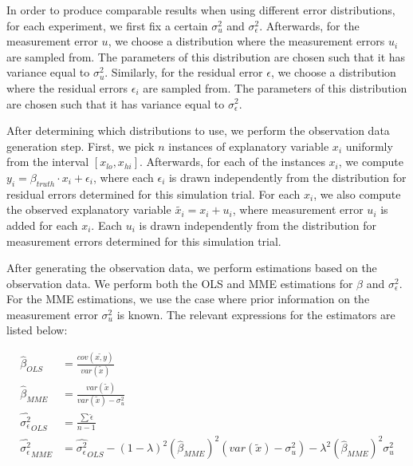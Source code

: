 \documentclass{article}
\begin{document}
In order to produce comparable results when using different error distributions, for each experiment, we first fix a certain $\sigma^2_u$ and $\sigma^2_\epsilon$.
Afterwards, for the measurement error $u$, we choose a distribution where the measurement errors $u_i$ are sampled from.
The parameters of this distribution are chosen such that it has variance equal to $\sigma_u^2$.
Similarly, for the residual error $\epsilon$, we choose a distribution where the residual errors $\epsilon_i$ are sampled from.
The parameters of this distribution are chosen such that it has variance equal to $\sigma_\epsilon^2$.

After determining which distributions to use, we perform the observation data generation step.
First, we pick $n$ instances of explanatory variable $x_i$ uniformly from the interval $[x_{lo}, x_{hi}]$.
Afterwards, for each of the instances $x_i$, we compute $y_i = \beta_{truth} \cdot x_i + \epsilon_i$, where each $\epsilon_i$ is drawn independently from the distribution for residual errors determined for this simulation trial.
For each $x_i$, we also compute the observed explanatory variable $\tilde{x_i} = x_i + u_i$, where measurement error $u_i$ is added for each $x_i$. Each $u_i$ is drawn independently from the distribution for measurement errors determined for this simulation trial.

After generating the observation data, we perform estimations based on the observation data. We perform both the OLS and MME estimations for $\beta$ and $\sigma_\epsilon^2$. For the MME estimations, we use the case where prior information on the measurement error $\sigma_u^2$ is known. The relevant expressions for the estimators are listed below:

\begin{equation}
    \begin{split}
        \hat{\beta}_{OLS} &= \frac{cov(\tilde{x, y})}{var(\tilde{x})}\\
        \hat{\beta}_{MME} &= \frac{var(\tilde{x})}{var(\tilde{x}) - \sigma^2_u}\\
        \hat{\sigma^2_\epsilon}_{OLS} &= \frac{\sum \hat{\epsilon}}{n-1}\\
        \hat{\sigma_\epsilon^2}_{MME} &= \hat{\sigma^2_\epsilon}_{OLS} -  (1-\lambda)^2 (\hat{\beta}_{MME})^2 (var(\tilde{x}) - \sigma^2_u) - \lambda^2 (\hat{\beta}_{MME})^2 \sigma_u^2\\
    \end{split}
\end{equation}
\end{document}

